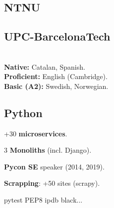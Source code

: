 \documentclass[a4paper]{MagicalCV}
\begin{document}
\lastupdated


\begin{minipage}[t]{0.33\textwidth}


\subsection{NTNU}
\vspace{\topsep} %

\sectionsep

\subsection{UPC-BarcelonaTech}
\sectionsep

 \\
\textbf{Native: } Catalan, Spanish. \\
\textbf{Proficient: } English (Cambridge). \\
\textbf{Basic (A2): } Swedish, Norwegian.\\

\sectionsep

\sectionsep
\subsection{Python}
\begin{tightemize}
\item +30 {\bf microservices}.
\item 3 {\bf Monoliths} (incl. Django).
\item {\bf Pycon SE} speaker (2014, 2019). %
\item {\bf Scrapping}: +50 sites (scrapy).
\item pytest \textbullet{} PEP8 \textbullet{} ipdb \textbullet{} black...
\end{tightemize}
\sectionsep

\end{minipage}
\end{document}
